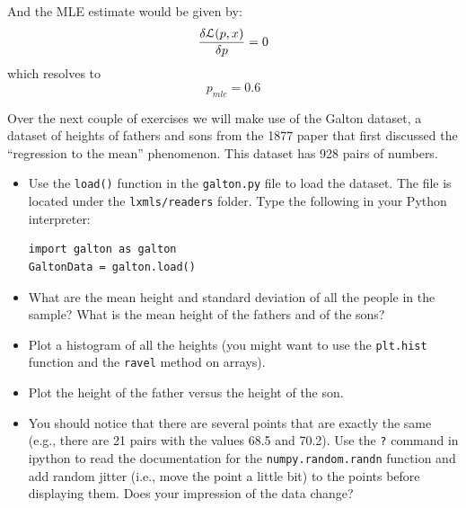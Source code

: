 And the MLE estimate would be given by:
\begin{equation*}
\frac{\delta \mathcal{L}(p,x)}{\delta p}=0
\end{equation*}
which resolves to
\begin{equation*}
p_{mle}=0.6
\end{equation*}

\begin{exercise}
Over the next couple of exercises we will make use of the Galton dataset, a
dataset of heights of fathers and sons from the 1877 paper that first discussed
the ``regression to the mean'' phenomenon. This dataset has 928 pairs of numbers.

\begin{itemize}
\item Use the \texttt{load()} function in the \texttt{galton.py} file to load
the dataset. The file is located under the \texttt{lxmls/readers} folder. Type the following in your Python interpreter:
\begin{verbatim}
import galton as galton
GaltonData = galton.load()
\end{verbatim}
\item What are the mean height and standard deviation of all the people in the
sample? What is the mean height of the fathers and of the sons?
\item Plot a histogram of all the heights (you might want to use the
\texttt{plt.hist} function and the \texttt{ravel} method on arrays).
\item Plot the height of the father versus the height of the son.
\item You should notice that there are several points that are exactly the same
(e.g., there are 21 pairs with the values 68.5 and 70.2). Use the \texttt{?}
command in ipython to read the documentation for the \texttt{numpy.random.randn}
function and add random jitter (i.e., move the point a little bit) to the
points before displaying them. Does your impression of the data change?
\end{itemize}
\end{exercise}
